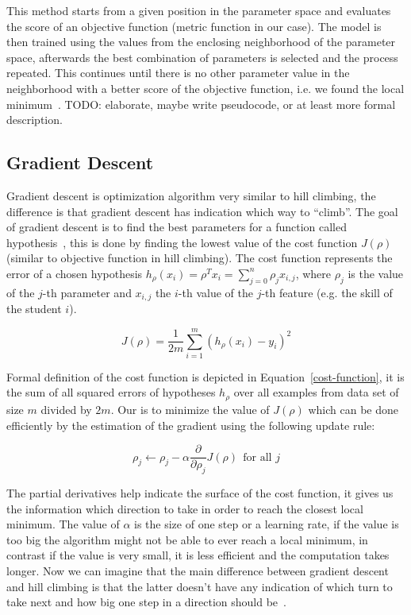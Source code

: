 This method starts from a given position in the parameter space and evaluates the score of an objective function (metric function in our case). The model is then trained using the values from the enclosing neighborhood of the parameter space, afterwards the best combination of parameters is selected and the process repeated. This continues until there is no other parameter value in the neighborhood with a better score of the objective function, i.e. we found the local minimum~\cite{Russell2009}. TODO: elaborate, maybe write pseudocode, or at least more formal description.

\subsection{Gradient Descent}
\label{gradient-descent}

Gradient descent is optimization algorithm very similar to hill climbing, the difference is that gradient descent has indication which way to ``climb''. The goal of gradient descent is to find the best parameters for a function called hypothesis~\cite{Klusasek2014}, this is done by finding the lowest value of the cost function $J(\rho)$ (similar to objective function in hill climbing). The cost function represents the error of a chosen hypothesis $h_{\rho}(x_i) = \rho^T x_i = \sum^n_{j=0} \rho_j x_{i,j}$, where $\rho_j$ is the value of the $j$-th parameter and $x_{i,j}$ the $i$-th value of the $j$-th feature (e.g. the skill of the student $i$).

\begin{equation} \label{cost-function}
  J(\rho) = \frac{1}{2m} \sum^m_{i=1} (h_{\rho}(x_i) - y_i)^2
\end{equation}

Formal definition of the cost function is depicted in Equation~\ref{cost-function}, it is the sum of all squared errors of hypotheses $h_{\rho}$ over all examples from data set of size $m$ divided by $2m$. Our is to minimize the value of $J(\rho)$ which can be done efficiently by the estimation of the gradient using the following update rule:

\begin{equation} \label{cost-function-update}
  \rho_j \gets \rho_j - \alpha \frac{\partial}{\partial \rho_j} J(\rho)~~\text{for all } j
\end{equation}

The partial derivatives help indicate the surface of the cost function, it gives us the information which direction to take in order to reach the closest local minimum. The value of $\alpha$ is the size of one step or a learning rate, if the value is too big the algorithm might not be able to ever reach a local minimum, in contrast if the value is very small, it is less efficient and the computation takes longer. Now we can imagine that the main difference between gradient descent and hill climbing is that the latter doesn't have any indication of which turn to take next and how big one step in a direction should be~\cite{Russell2009}.

